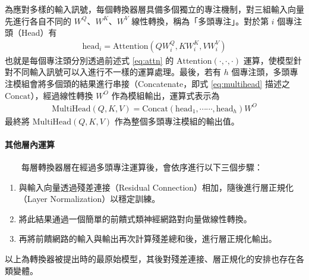         為應對多樣的輸入訊號，每個轉換器層具備多個獨立的專注機制，對三組輸入向量先進行各自不同的 $W^Q$、$W^K$、$W^V$ 線性轉換，稱為「多頭專注」。對於第 $i$ 個專注頭（Head）有
\begin{align}
    \text{head}_i = \text{Attention}(QW^Q_i,KW^K_i,VW^V_i)
\end{align}
也就是每個專注頭分別透過前述式 \eqref{eq:attn} 的 \(\text{Attention}(\cdot, \cdot, \cdot)\) 運算，使模型針對不同輸入訊號可以入進行不一樣的運算處理。最後，若有 $h$ 個專注頭，多頭專注模組會將多個頭的結果進行串接（Concatenate，即式 \eqref{eq:multihead} 描述之 \( \text{Concat} \)），經過線性轉換 $W^O$ 作為模組輸出，運算式表示為
\begin{align}
    \text{MultiHead}(Q, K, V) = \text{Concat}(\text{head}_1, \cdots\cdots, \text{head}_h) W^O
    \label{eq:multihead}
\end{align}
最終將 \(\text{MultiHead}(Q, K, V)\) 作為整個多頭專注模組的輸出值。

\paragraph{其他層內運算} \hfill \break
%
　　每層轉換器層在經過多頭專注運算後，會依序進行以下三個步驟：

\begin{enumerate}
    \item 與輸入向量透過殘差連接（Residual Connection）相加，隨後進行層正規化（Layer Normalization）以穩定訓練。
    \item 將此結果通過一個簡單的前饋式類神經網路對向量做線性轉換。
    \item 再將前饋網路的輸入與輸出再次計算殘差總和後，進行層正規化輸出。
\end{enumerate}

        以上為轉換器被提出時的最原始模型，其後對殘差連接、層正規化的安排也存在各類變體。

